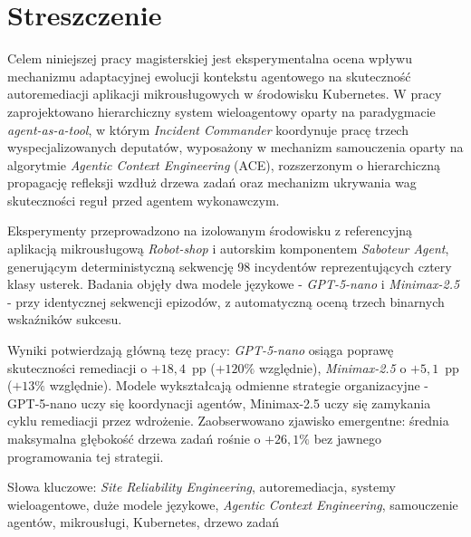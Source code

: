 \chapter*{Streszczenie}

Celem niniejszej pracy magisterskiej jest eksperymentalna ocena wpływu mechanizmu adaptacyjnej ewolucji kontekstu agentowego na skuteczność autoremediacji aplikacji mikrousługowych w środowisku Kubernetes. W pracy zaprojektowano hierarchiczny system wieloagentowy oparty na paradygmacie \textit{agent-as-a-tool}, w którym \textit{Incident Commander} koordynuje pracę trzech wyspecjalizowanych deputatów, wyposażony w mechanizm samouczenia oparty na algorytmie \textit{Agentic Context Engineering} (ACE), rozszerzonym o hierarchiczną propagację refleksji wzdłuż drzewa zadań oraz mechanizm ukrywania wag skuteczności reguł przed agentem wykonawczym.

Eksperymenty przeprowadzono na izolowanym środowisku z referencyjną aplikacją mikrousługową \textit{Robot-shop} i autorskim komponentem \textit{Saboteur Agent}, generującym deterministyczną sekwencję 98 incydentów reprezentujących cztery klasy usterek. Badania objęły dwa modele językowe - \textit{GPT-5-nano} i \textit{Minimax-2.5} - przy identycznej sekwencji epizodów, z automatyczną oceną trzech binarnych wskaźników sukcesu.

Wyniki potwierdzają główną tezę pracy: \textit{GPT-5-nano} osiąga poprawę skuteczności remediacji o $+18{,}4$~pp ($+120\%$ względnie), \textit{Minimax-2.5} o $+5{,}1$~pp ($+13\%$ względnie). Modele wykształcają odmienne strategie organizacyjne - GPT-5-nano uczy się koordynacji agentów, Minimax-2.5 uczy się zamykania cyklu remediacji przez wdrożenie. Zaobserwowano zjawisko emergentne: średnia maksymalna głębokość drzewa zadań rośnie o $+26{,}1\%$ bez jawnego programowania tej strategii.

\vspace{20pt}
\noindent Słowa kluczowe: \textit{Site Reliability Engineering}, autoremediacja, systemy wieloagentowe, duże modele językowe, \textit{Agentic Context Engineering}, samouczenie agentów, mikrousługi, Kubernetes, drzewo zadań
